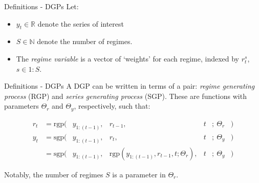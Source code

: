 \documentclass[
  ignorenonframetext,
]{beamer}
\providecommand{\tightlist}{%
  \setlength{\itemsep}{0pt}\setlength{\parskip}{0pt}}\usepackage{longtable,booktabs,array}
\newcommand{\sgp}{\text{sgp}}
\newcommand{\rgp}{\text{rgp}}
\begin{document}
\begin{frame}{Definitions - DGPs}
\label{definitions---dgps}
Let:

\begin{itemize}
\tightlist
\item
  \(y_t \in \mathbb{R}\) denote the series of interest

\item
  \(S \in \mathbb{N}\) denote the number of regimes.
\item
  The \emph{regime variable} is a vector of `weights' for each regime,
  indexed by \(r^s_t\), \(s \in 1:S\).
\end{itemize}
\end{frame}

\begin{frame}{Definitions - DGPs}
\label{definitions---dgps-1}
A DGP can be written in terms of a pair: \emph{regime generating
process} (RGP) and \emph{series generating process} (SGP). These are
functions with parameters \(\Theta_r\) and \(\Theta_y\), respectively,
such that:

\begin{equation}
\begin{array}{rrlllll}
    r_t &= \rgp(&y_{1:(t-1)}, &r_{t-1}, &t &;~ \Theta_r &)\\
    y_t &= \sgp(&y_{1:(t-1)}, &r_t,     &t &;~ \Theta_y &)\\
        &= \sgp(&y_{1:(t-1)}, &\rgp(y_{1:(t-1)}, r_{t-1}, t; \Theta_r), &t &;~ \Theta_y &)
\end{array}
\end{equation}

Notably, the number of regimes \(S\) is a parameter in \(\Theta_r\).
\end{frame}

\end{document}
